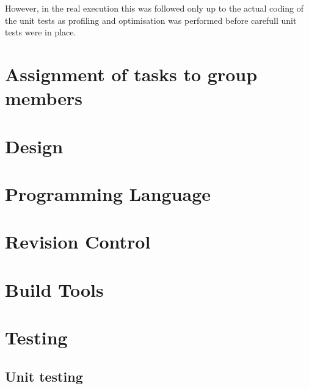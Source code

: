 \documentclass[12pt,a4paper]{article}
\begin{document}
However, in the real execution this was followed only up to the actual coding of the unit tests as profiling and optimisation was performed before carefull unit tests were in place. 




\section{Assignment of tasks to group members}
\label{Assignment of tasks to group members}




\section{Design}
\label{Design}



\section{Programming Language}
\label{Programming Language}



\section{Revision Control}
\label{Revision Control}



\section{Build Tools}
\label{Build Tools}



\section{Testing}
\label{Testing}

\subsection{Unit testing}
\label{unittesting}
\end{document}
